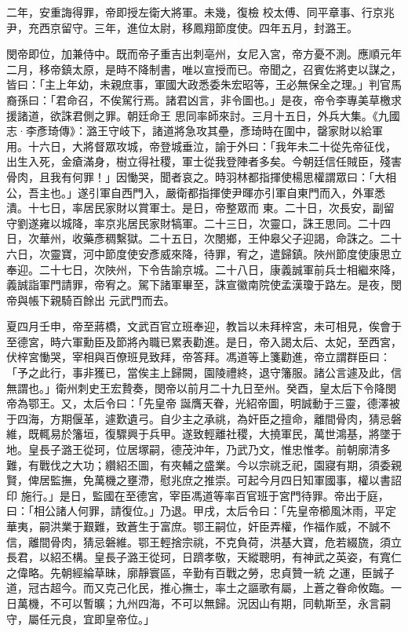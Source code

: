 \begin{pinyinscope}
 二年，安重誨得罪，帝即授左衛大將軍。未幾，復檢
 校太傅、同平章事、行京兆尹，充西京留守。三年，進位太尉，移鳳翔節度使。四年五月，封潞王。



 閔帝即位，加兼侍中。既而帝子重吉出刺亳州，女尼入宮，帝方憂不測。應順元年二月，移帝鎮太原，是時不降制書，唯以宣授而已。帝聞之，召賓佐將吏以謀之，皆曰：「主上年幼，未親庶事，軍國大政悉委朱宏昭等，王必無保全之理。」判官馬裔孫曰：「君命召，不俟駕行焉。諸君凶言，非令圖也。」是夜，帝令李專美草檄求援諸道，欲誅君側之罪。朝廷命王
 思同率師來討。三月十五日，外兵大集。《九國志·李彥琦傳》：潞王守岐下，諸道將急攻其壘，彥琦時在圍中，罄家財以給軍用。十六日，大將督眾攻城，帝登城垂泣，諭于外曰：「我年未二十從先帝征伐，出生入死，金瘡滿身，樹立得社稷，軍士從我登陣者多矣。今朝廷信任賊臣，殘害骨肉，且我有何罪！」因慟哭，聞者哀之。時羽林都指揮使楊思權謂眾曰：「大相公，吾主也。」遂引軍自西門入，嚴衛都指揮使尹暉亦引軍自東門而入，外軍悉潰。十七日，率居民家財以賞軍士。是日，帝整眾而
 東。二十日，次長安，副留守劉遂雍以城降，率京兆居民家財犒軍。二十三日，次靈口，誅王思同。二十四日，次華州，收藥彥稠繫獄。二十五日，次閿鄉，王仲皋父子迎謁，命誅之。二十六日，次靈寶，河中節度使安彥威來降，待罪，宥之，遣歸鎮。陜州節度使康思立奉迎。二十七日，次陜州，下令告諭京城。二十八日，康義誠軍前兵士相繼來降，義誠詣軍門請罪，帝宥之。駕下諸軍畢至，誅宣徽南院使孟漢瓊于路左。是夜，閔帝與帳下親騎百餘出
 元武門而去。



 夏四月壬申，帝至蔣橋，文武百官立班奉迎，教旨以未拜梓宮，未可相見，俟會于至德宮，時六軍勳臣及節將內職已累表勸進。是日，帝入謁太后、太妃，至西宮，伏梓宮慟哭，宰相與百僚班見致拜，帝答拜。馮道等上箋勸進，帝立謂群臣曰：「予之此行，事非獲已，當俟主上歸闕，園陵禮終，退守籓服。諸公言遽及此，信無謂也。」衛州刺史王宏贄奏，閔帝以前月二十九日至州。癸酉，皇太后下令降閔帝為鄂王。又，太后令曰：「先皇帝
 誕膺天眷，光紹帝圖，明誠動于三靈，德澤被于四海，方期偃革，遽歎遺弓。自少主之承祧，為奸臣之擅命，離間骨肉，猜忌磐維，既輒易於籓垣，復驟興于兵甲。遂致輕離社稷，大撓軍民，萬世鴻基，將墜于地。皇長子潞王從珂，位居塚嗣，德茂沖年，乃武乃文，惟忠惟孝。前朝廓清多難，有戰伐之大功；纘紹丕圖，有夾輔之盛業。今以宗祧乏祀，園寢有期，須委親賢，俾居監撫，免萬機之壅滯，慰兆庶之推崇。可起今月四日知軍國事，權以書詔印
 施行。」是日，監國在至德宮，宰臣馮道等率百官班于宮門待罪。帝出于庭，曰：「相公諸人何罪，請復位。」乃退。甲戌，太后令曰：「先皇帝櫛風沐雨，平定華夷，嗣洪業于艱難，致蒼生于富庶。鄂王嗣位，奸臣弄權，作福作威，不誠不信，離間骨肉，猜忌磐維。鄂王輕捨宗祧，不克負荷，洪基大寶，危若綴旒，須立長君，以紹丕構。皇長子潞王從珂，日躋孝敬，天縱聰明，有神武之英姿，有寬仁之偉略。先朝經綸草昧，廓靜寰區，辛勤有百戰之勞，忠貞贊一統
 之運，臣誠子道，冠古超今。而又克己化民，推心撫士，率土之謳歌有屬，上蒼之眷命攸臨。一日萬機，不可以暫曠；九州四海，不可以無歸。況因山有期，同軌斯至，永言嗣守，屬任元良，宜即皇帝位。」




\end{pinyinscope}
